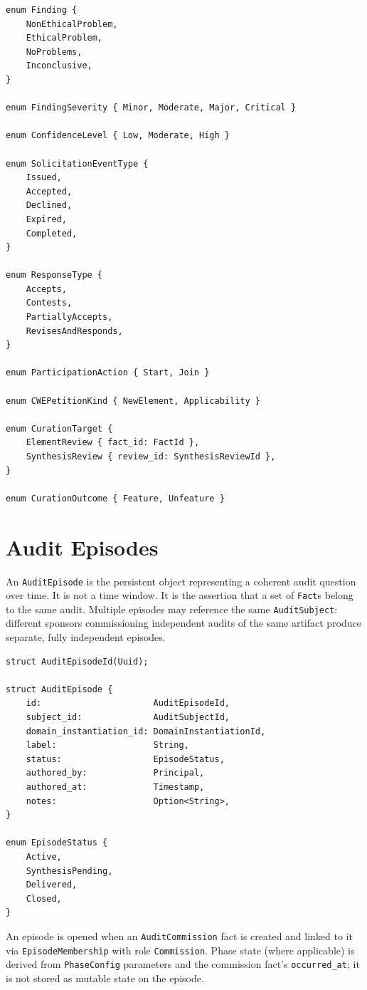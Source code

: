 \documentclass[11pt]{article}
\begin{document}
\begin{lstlisting}
enum Finding {
    NonEthicalProblem,
    EthicalProblem,
    NoProblems,
    Inconclusive,
}

enum FindingSeverity { Minor, Moderate, Major, Critical }

enum ConfidenceLevel { Low, Moderate, High }

enum SolicitationEventType {
    Issued,
    Accepted,
    Declined,
    Expired,
    Completed,
}

enum ResponseType {
    Accepts,
    Contests,
    PartiallyAccepts,
    RevisesAndResponds,
}

enum ParticipationAction { Start, Join }

enum CWEPetitionKind { NewElement, Applicability }

enum CurationTarget {
    ElementReview { fact_id: FactId },
    SynthesisReview { review_id: SynthesisReviewId },
}

enum CurationOutcome { Feature, Unfeature }
\end{lstlisting}

\section{Audit Episodes}

An \texttt{AuditEpisode} is the persistent object representing a coherent audit
question over time. It is not a time window. It is the assertion that a set of
\texttt{Fact}s belong to the same audit. Multiple episodes may reference the
same \texttt{AuditSubject}: different sponsors commissioning independent audits
of the same artifact produce separate, fully independent episodes.

\begin{lstlisting}
struct AuditEpisodeId(Uuid);

struct AuditEpisode {
    id:                      AuditEpisodeId,
    subject_id:              AuditSubjectId,
    domain_instantiation_id: DomainInstantiationId,
    label:                   String,
    status:                  EpisodeStatus,
    authored_by:             Principal,
    authored_at:             Timestamp,
    notes:                   Option<String>,
}

enum EpisodeStatus {
    Active,
    SynthesisPending,
    Delivered,
    Closed,
}
\end{lstlisting}

An episode is opened when an \texttt{AuditCommission} fact is created and
linked to it via \texttt{EpisodeMembership} with role \texttt{Commission}.
Phase state (where applicable) is derived from \texttt{PhaseConfig} parameters
and the commission fact's \texttt{occurred\_at}; it is not stored as mutable
state on the episode.
\end{document}
